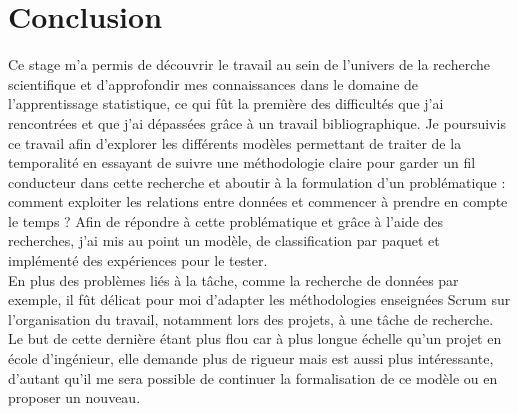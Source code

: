 \chapter*{Conclusion} %
Ce stage  m’a permis de découvrir le travail au sein de l’univers de la recherche scientifique et d’approfondir mes connaissances dans le domaine de l’apprentissage statistique, ce qui fût la première des difficultés que j’ai rencontrées et que j’ai dépassées grâce à un travail bibliographique. Je poursuivis ce travail afin d’explorer les différents modèles permettant de traiter de la temporalité en essayant de
suivre une méthodologie claire pour garder un fil conducteur dans cette recherche et aboutir
à la formulation d’un problématique : comment exploiter les relations entre données et
commencer à prendre en compte le temps ? Afin de répondre à cette problématique et grâce
à l’aide des recherches, j’ai mis au point un modèle, de classification par
paquet et implémenté des expériences pour le tester.\\[0.2cm]
En plus des problèmes liés à la tâche, comme la recherche de données par exemple, il fût
délicat pour moi d’adapter les méthodologies enseignées Scrum sur
l’organisation du travail, notamment lors des projets, à une tâche de recherche. Le but de
cette dernière étant plus flou car à plus longue échelle qu’un projet en école d’ingénieur, elle
demande plus de rigueur mais est aussi plus intéressante, d’autant qu’il me sera possible de
continuer la formalisation de ce modèle ou en proposer un nouveau.
